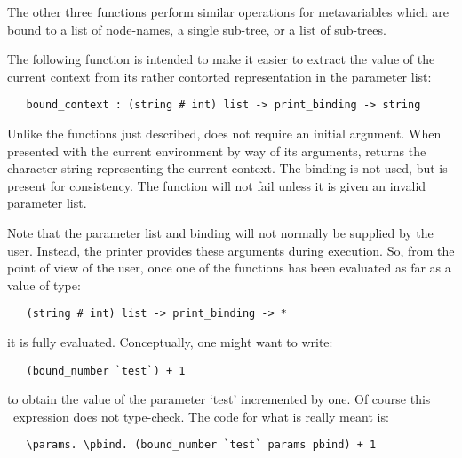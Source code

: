 The other three functions perform similar operations for metavariables which
are bound to a list of node-names, a single sub-tree, or a list of sub-trees.

The following function is intended to make it easier to extract the value of
the current context from its rather contorted representation in the parameter
list:

\begin{boxed}\begin{verbatim}
   bound_context : (string # int) list -> print_binding -> string
\end{verbatim}\end{boxed}

\noindent
Unlike the functions just described,  does not require an
initial argument. When presented with the current environment by way of its
arguments,  returns the character string representing the
current context. The binding is not used, but is present for consistency. The
function will not fail unless it is given an invalid parameter list.

Note that the parameter list and binding will not normally be supplied by the
user. Instead, the printer provides these arguments during execution. So, from
the point of view of the user, once one of the functions has been evaluated as
far as a value of type:

\begin{small}\begin{verbatim}
   (string # int) list -> print_binding -> *
\end{verbatim}\end{small}

\noindent
it is fully evaluated. Conceptually, one might want to write:

\begin{small}\begin{verbatim}
   (bound_number `test`) + 1
\end{verbatim}\end{small}

\noindent
to obtain the value of the parameter `test' incremented by one. Of course this
\ML\ expression does not type-check. The code for what is really meant is:

\begin{small}\begin{verbatim}
   \params. \pbind. (bound_number `test` params pbind) + 1
\end{verbatim}\end{small}

